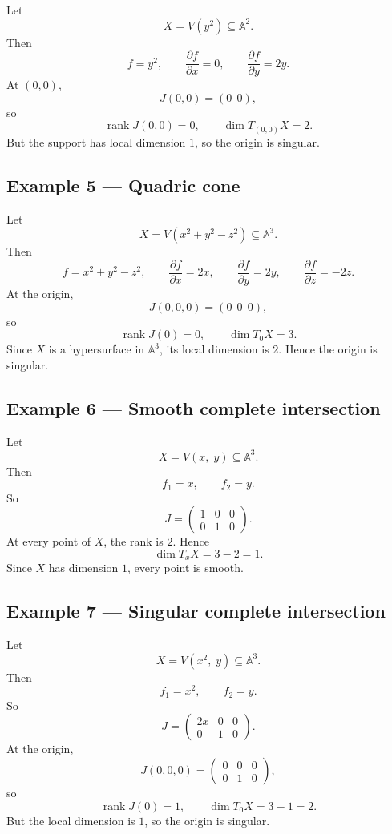 \documentclass[12pt,a4paper]{article}
\theoremstyle{plain}
\theoremstyle{definition}      %
\begin{document}
	Let
	\[
	X=V(y^2)\subseteq \mathbb A^2.
	\]
	Then
	\[
	f=y^2,
	\qquad
	\frac{\partial f}{\partial x}=0,
	\qquad
	\frac{\partial f}{\partial y}=2y.
	\]
	At \((0,0)\),
	\[
	J(0,0)=(0\ \ 0),
	\]
	so
	\[
	\operatorname{rank}J(0,0)=0,
	\qquad
	\dim T_{(0,0)}X=2.
	\]
	But the support has local dimension \(1\), so the origin is singular.
	
	\subsection*{Example 5 --- Quadric cone}
	
	Let
	\[
	X=V(x^2+y^2-z^2)\subseteq \mathbb A^3.
	\]
	Then
	\[
	f=x^2+y^2-z^2,
	\qquad
	\frac{\partial f}{\partial x}=2x,\qquad
	\frac{\partial f}{\partial y}=2y,\qquad
	\frac{\partial f}{\partial z}=-2z.
	\]
	At the origin,
	\[
	J(0,0,0)=(0\ \ 0\ \ 0),
	\]
	so
	\[
	\operatorname{rank}J(0)=0,
	\qquad
	\dim T_0X=3.
	\]
	Since \(X\) is a hypersurface in \(\mathbb A^3\), its local dimension is \(2\). Hence the origin is singular.
	
	\subsection*{Example 6 --- Smooth complete intersection}
	
	Let
	\[
	X=V(x,\;y)\subseteq \mathbb A^3.
	\]
	Then
	\[
	f_1=x,\qquad f_2=y.
	\]
	So
	\[
	J=
	\begin{pmatrix}
		1&0&0\\
		0&1&0
	\end{pmatrix}.
	\]
	At every point of \(X\), the rank is \(2\). Hence
	\[
	\dim T_xX=3-2=1.
	\]
	Since \(X\) has dimension \(1\), every point is smooth.
	
	\subsection*{Example 7 --- Singular complete intersection}
	
	Let
	\[
	X=V(x^2,\;y)\subseteq \mathbb A^3.
	\]
	Then
	\[
	f_1=x^2,\qquad f_2=y.
	\]
	So
	\[
	J=
	\begin{pmatrix}
		2x&0&0\\
		0&1&0
	\end{pmatrix}.
	\]
	At the origin,
	\[
	J(0,0,0)=
	\begin{pmatrix}
		0&0&0\\
		0&1&0
	\end{pmatrix},
	\]
	so
	\[
	\operatorname{rank}J(0)=1,
	\qquad
	\dim T_0X=3-1=2.
	\]
	But the local dimension is \(1\), so the origin is singular.
	
\end{document}
